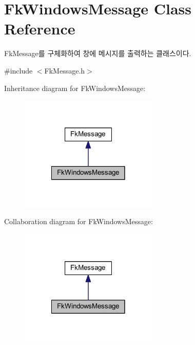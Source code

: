 \hypertarget{class_fk_windows_message}{}\section{Fk\+Windows\+Message Class Reference}
\label{class_fk_windows_message}


Fk\+Message를 구체화하여 창에 메시지를 출력하는 클래스이다.  




{\ttfamily \#include $<$Fk\+Message.\+h$>$}



Inheritance diagram for Fk\+Windows\+Message\+:\nopagebreak
\begin{figure}[H]
\begin{center}
\leavevmode
\includegraphics[width=186pt]{class_fk_windows_message__inherit__graph}
\end{center}
\end{figure}


Collaboration diagram for Fk\+Windows\+Message\+:\nopagebreak
\begin{figure}[H]
\begin{center}
\leavevmode
\includegraphics[width=186pt]{class_fk_windows_message__coll__graph}
\end{center}
\end{figure}
